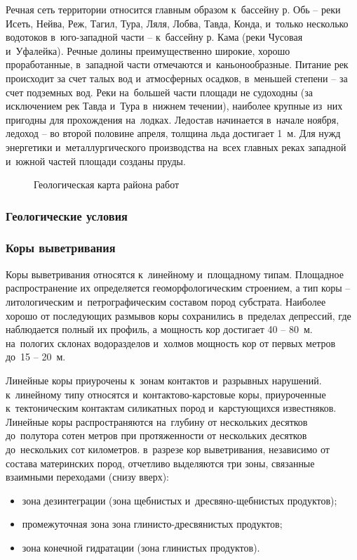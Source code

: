 Речная сеть территории относится главным образом к~бассейну р. Обь  --  реки Исеть, Нейва, Реж, Тагил, Тура, Ляля, Лобва, Тавда, Конда, и~только несколько водотоков в~юго-западной части  --  к~бассейну р. Кама (реки Чусовая и~Уфалейка). Речные долины преимущественно широкие, хорошо проработанные, в~западной части отмечаются и~каньонообразные. Питание рек происходит за счет талых вод и~атмосферных осадков, в~меньшей степени  --  за счет подземных вод. Реки на~большей части площади не судоходны (за исключением рек Тавда и~Тура в~нижнем течении), наиболее крупные из~них пригодны для прохождения на~лодках. Ледостав начинается в~начале ноября, ледоход  --  во второй половине апреля, толщина льда достигает 1~м. Для нужд энергетики и~металлургического производства на~всех
главных реках западной и~южной частей площади созданы пруды.

\begin{figure}[h]
	\caption{Геологическая карта района работ}
\end{figure}

\subsubsection{Геологические условия}
\txtGeology

\subsubsection*{Коры выветривания}
Коры выветривания относятся к~линейному и~площадному типам. Площадное распространение их определяется геоморфологическим строением, а тип коры  --  литологическим и~петрографическим составом пород субстрата. Наиболее хорошо от последующих размывов коры сохранились в~пределах депрессий, где наблюдается полный их профиль, а  мощность кор достигает 40  --  80~м. на~пологих склонах водоразделов и~холмов мощность кор от первых метров до~15 -- 20~м.

Линейные коры приурочены к~зонам контактов и~разрывных нарушений. к~линейному типу относятся и~контактово-карстовые коры, приуроченные к~тектоническим контактам силикатных пород и~карстующихся
известняков. Линейные коры распространяются на~глубину от нескольких десятков до~полутора сотен метров при протяженности от нескольких десятков до~нескольких сот километров. в~разрезе кор выветривания, независимо от состава материнских пород, отчетливо выделяются три зоны, связанные взаимными переходами (снизу вверх): 
\begin{itemize}
\item зона дезинтеграции (зона щебнистых и~дресвяно-щебнистых продуктов);
\item промежуточная зона зона глинисто-дресвянистых продуктов;
\item зона конечной гидратации (зона глинистых продуктов).
\end{itemize}


